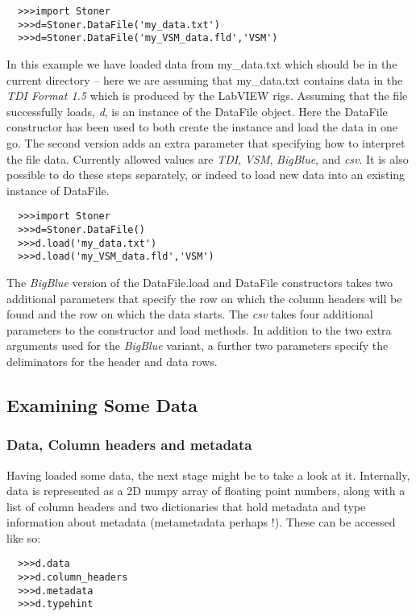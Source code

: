 \documentclass[a4paper,11pt]{scrartcl}
\begin{document}
\begin{verbatim}
  >>>import Stoner
  >>>d=Stoner.DataFile('my_data.txt')
  >>>d=Stoner.DataFile('my_VSM_data.fld','VSM')
\end{verbatim}

In this example we have loaded data from my\_data.txt which should be in the current directory -- here we are assuming that my\_data.txt contains data in the \textit{TDI Format 1.5} which is produced by the LabVIEW rigs. Assuming that the file successfully loads, \textit{d}, is an instance of the DataFile object. Here the DataFile constructor has been used to both create the instance and load the data in one go. The second version adds an extra parameter that specifying how to interpret the file data. Currently allowed values are \textit{TDI}, \textit{VSM}, \textit{BigBlue}, and \textit{csv}. It is also possible to do these steps separately, or indeed to load new data into an existing instance of DataFile.

\begin{verbatim}
  >>>import Stoner
  >>>d=Stoner.DataFile()
  >>>d.load('my_data.txt')
  >>>d.load('my_VSM_data.fld','VSM')
\end{verbatim}

The \textit{BigBlue} version of the DataFile.load and DataFile constructors takes two additional parameters that specify the row on which the column headers will be found and the row on which the data starts. The \textit{csv} takes four additional parameters to the constructor and load methods. In addition to the two extra arguments used for the \textit{BigBlue} variant, a further two parameters specify the deliminators for the header and data rows.


\subsection{Examining Some Data}
\subsubsection{Data, Column headers and metadata}
Having loaded some data, the next stage might be to take a look at it. Internally, data is represented as a 2D numpy array of floating point numbers, along with a list of column headers and two dictionaries that hold metadata and type information about metadata (metametadata perhaps !). These can be accessed like so:
\begin{verbatim}
  >>>d.data
  >>>d.column_headers
  >>>d.metadata
  >>>d.typehint
\end{verbatim}
\end{document}

